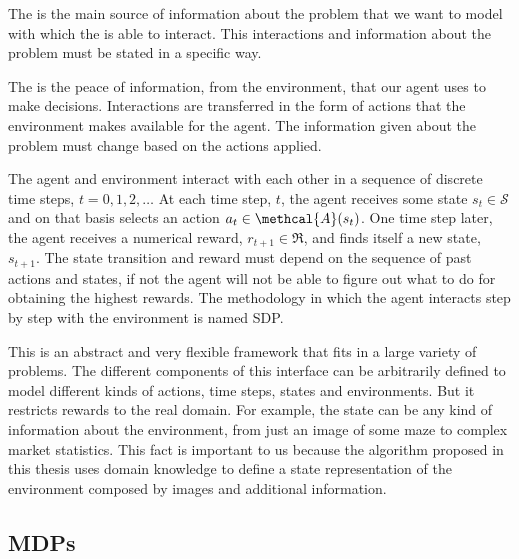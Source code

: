 The  is the main source of information about the problem that we want to model with which the  is able to interact. This interactions and information about the problem must be stated in a specific way.

The  is the peace of information, from the environment, that our agent uses to make decisions. Interactions are transferred in the form of actions that the environment makes available for the agent. The information given about the problem must change based on the actions applied.

The agent and environment interact with each other in a sequence of discrete time steps, $t=0,1,2,\dots$ At each time step, $t$, the agent receives some state $s_t \in \mathcal{S}$ and on that basis selects an action $a_t \in \methcal{A}( s_t )$. One time step later, the agent receives a numerical reward, $r_{t+1} \in \Re$, and finds itself a new state, $s_{t+1}$. The state transition and reward must depend on the sequence of past actions and states, if not the agent will not be able to figure out what to do for obtaining the highest rewards. The methodology in which the agent interacts step by step with the environment is named \acf{SDP}.


This is an abstract and very flexible framework that fits in a large variety of problems. The different components of this interface can be arbitrarily defined to model different kinds of actions, time steps, states and environments. But it restricts rewards to the real domain. For example, the state can be any kind of information about the environment, from just an image of some maze to complex market statistics. This fact is important to us because the algorithm proposed in this thesis uses domain knowledge to define a state representation of the environment composed by images and additional information.

\subsection{\aclp{MDP}\label{subsec:MDP}}

